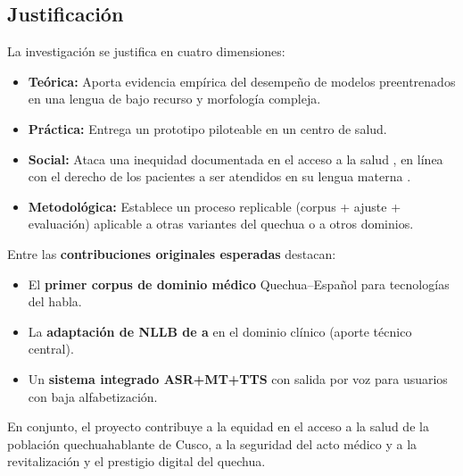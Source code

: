 \subsection{Justificaci{\'o}n}
\noindent La investigaci{\'o}n se justifica en cuatro dimensiones:
\begin{itemize}\setlength{\itemsep}{1pt}
  \item \textbf{Te{\'o}rica:} Aporta evidencia emp{\'i}rica del desempe{\~n}o de modelos
  preentrenados en una lengua de bajo recurso y morfolog{\'i}a compleja.
  \item \textbf{Pr{\'a}ctica:} Entrega un prototipo piloteable en un centro de salud.
  \item \textbf{Social:} Ataca una inequidad documentada en el acceso a la salud
  \parencite{begazo2026}, en l{\'i}nea con el derecho de los pacientes a ser atendidos en su
  lengua materna \parencite{essalud2023}.
  \item \textbf{Metodol{\'o}gica:} Establece un proceso replicable (corpus + ajuste + evaluaci{\'o}n)
  aplicable a otras variantes del quechua o a otros dominios.
\end{itemize}
\noindent Entre las \textbf{contribuciones originales esperadas} destacan:
\begin{itemize}\setlength{\itemsep}{1pt}
  \item El \textbf{primer corpus de dominio m{\'e}dico} Quechua--Espa{\~n}ol para tecnolog{\'i}as del habla.
  \item La \textbf{adaptaci{\'o}n de NLLB de  a } en el dominio cl{\'i}nico
  (aporte t{\'e}cnico central).
  \item Un \textbf{sistema integrado ASR+MT+TTS} con salida por voz para usuarios con baja alfabetizaci{\'o}n.
\end{itemize}
\noindent En conjunto, el proyecto contribuye a la equidad en el acceso a la salud de la
poblaci{\'o}n quechuahablante de Cusco, a la seguridad del acto m{\'e}dico y a la revitalizaci{\'o}n
y el prestigio digital del quechua.


